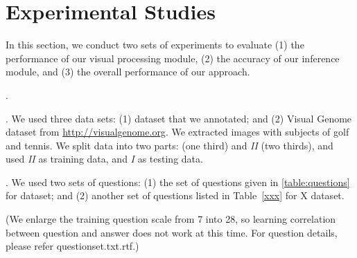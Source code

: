 
\section{Experimental Studies}
\label{sec-expt}

In this section, we conduct two sets of experiments to evaluate (1) the performance of our visual processing module, (2) the accuracy of our inference module, and (3) the overall performance of our approach.

. %

. We used three data sets: (1)  dataset that we annotated; and (2) Visual Genome dataset from \url{http://visualgenome.org}. We extracted images with subjects of golf and tennis. We split  data into two parts: {\color{red}{\em  I} (one third) and {\em II} (two thirds), and used {\em II} as training data, and {\em I} as testing data}. 

. We used two sets of questions: (1) the set of questions given in \autoref{table:questions} for  dataset; and (2) {\color{red}another set of questions listed in Table~\ref{xxx} for X dataset}. 

(We enlarge the training question scale from 7 into 28, so learning correlation between question and answer does not work at this time. For question details, please refer questionset.txt.rtf.)


